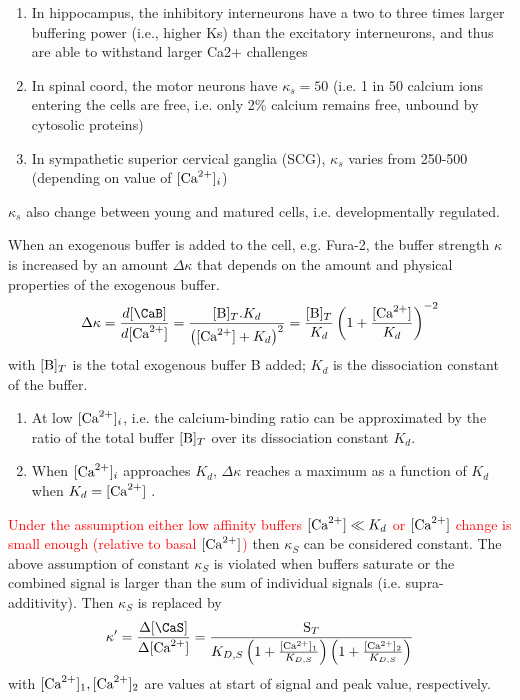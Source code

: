 \begin{enumerate}
  \item In hippocampus, the inhibitory interneurons have a two to three times
  larger buffering power (i.e., higher Ks) than the excitatory interneurons, and
  thus are able to withstand larger Ca2+ challenges \citep{lee2000}
  \item In spinal coord, the motor neurons have $\kappa_s = 50$ (i.e. 1 in 50
  calcium ions entering the cells are free, i.e. only 2\% calcium remains free,
  unbound by cytosolic proteins)
  \item In sympathetic superior cervical ganglia (SCG), $\kappa_s$ varies from
  250-500 (depending on value of $[{\text{Ca}^{2+}}]_i$)
\end{enumerate}
$\kappa_s$ also change between young and matured cells, i.e. developmentally
regulated. 

When an exogenous buffer is added to the cell, e.g. Fura-2, the buffer strength
$\kappa$ is increased by an amount $\Delta \kappa$ that depends on the amount
and physical properties of the exogenous buffer.
\begin{equation}
\Delta \kappa = \frac{d[\CaB]}{d[\Ca]}=\frac{[\B]_T.K_d}{\left([\Ca] +
K_d \right)^2} = \frac{[\B]_T}{K_d}\left(1+ \frac{[\Ca]}{K_d}\right)^{-2}
\end{equation}
with $[{\text{B}}]_T$ is the total exogenous buffer B added; $K_d$ is the dissociation
constant of the buffer. 

\begin{enumerate}
  \item At low $[{\text{Ca}^{2+}}]_i$, i.e. the calcium-binding ratio can be approximated by
  the ratio of the total buffer $[{\text{B}}]_T$ over its dissociation constant $K_d$.
  \item When $[{\text{Ca}^{2+}}]_i$ approaches $K_d$, $\Delta \kappa$ reaches a
maximum as a function of $K_d$ when $K_d=[{\text{Ca}^{2+}}]$ \citep{wang1993lpf}.
\end{enumerate}

\textcolor{red}{Under the assumption either low affinity buffers $[{\text{Ca}^{2+}}] \ll
K_{d}$ or $[{\text{Ca}^{2+}}]$ change is small enough (relative to basal $[{\text{Ca}^{2+}}]$)} then
$\kappa_S$ can be considered constant.  The above assumption of constant
$\kappa_S$ is violated when buffers saturate or the combined signal is larger
than the sum of individual signals (i.e.
supra-additivity). Then $\kappa_S$ is replaced by
\begin{equation}
\kappa' = \frac{\Delta[\CaS]}{\Delta [\Ca]} =
\frac{\text{S}_T}{K_{D,S} \left( 1+ \frac{[\Ca]_1}{K_{D,S}} \right)
\left( 1+ \frac{[\Ca]_2}{K_{D,S}} \right) }
\end{equation}
with $[{\text{Ca}^{2+}}]_1, [{\text{Ca}^{2+}}]_2$ are values at start of signal and peak value,
respectively. 


